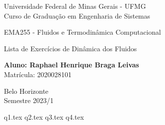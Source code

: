 \documentclass[12pt]{scrartcl}
\begin{document}
\begin{titlepage}
    \begin{center}
        \begin{Large}
            Universidade Federal de Minas Gerais - UFMG\\
            Curso de Graduação em Engenharia de Sistemas\\

            \vspace{5.0cm}


            EMA255 - Fluidos e Termodinâmica Computacional

            \vspace{5.0cm}

            Lista de Exercícios de Dinâmica dos Fluidos
            \vspace*{1cm}

            \textbf{Aluno: Raphael Henrique Braga Leivas}\\
            \vspace*{1cm}
            Matrícula: 2020028101

            \vspace{7cm}

            Belo Horizonte\\
            \vspace*{1cm}
            Semestre 2023/1
        \end{Large}
    \end{center}
\end{titlepage}

\pagestyle{fancy}

\fancyhead{}
\fancyfoot{}

{q1.tex}
{q2.tex}
{q3.tex}
{q4.tex}
\end{document}
